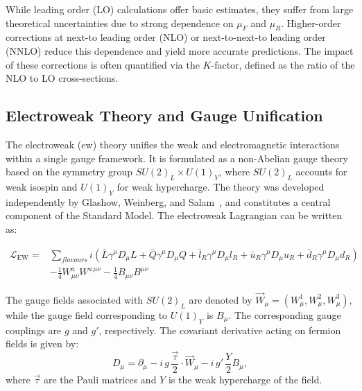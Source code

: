 While leading order (LO) calculations offer basic estimates, they suffer from large theoretical uncertainties due to strong dependence on $\mu_F$ and $\mu_R$. Higher-order corrections at next-to leading order (NLO) or next-to-next-to leading order (NNLO) reduce this dependence and yield more accurate predictions. The impact of these corrections is often quantified via the $K$-factor, defined as the ratio of the NLO to LO cross-sections.

\subsection{Electroweak Theory and Gauge Unification}
\label{subsec:ew_theory}

The electroweak (\acrshort{ew}) theory unifies the weak and electromagnetic interactions within a single gauge framework. It is formulated as a non-Abelian gauge theory based on the symmetry group $SU(2)_L \times U(1)_Y$, where $SU(2)_L$ accounts for weak isospin and $U(1)_Y$ for weak hypercharge. The theory was developed independently by Glashow, Weinberg, and Salam~\cite{Glashow,Weinberg,Salam}, and constitutes a central component of the Standard Model. The electroweak Lagrangian can be written as:

\begin{equation}
\begin{split}
\mathcal{L}_{\text{EW}} = 
&\sum_{flavours} i(\bar{L}\gamma^\mu D_\mu L +\bar{Q}\gamma^\mu D_\mu Q + \bar{l}_{R}\gamma^\mu D_\mu l_{R} + \bar{u}_{R}\gamma^\mu D_\mu u_{R} + \bar{d}_{R}\gamma^\mu D_\mu d_{R}) \\
&- \frac{1}{4} W_{\mu\nu}^a W^{a\,\mu\nu} - \frac{1}{4} B_{\mu\nu} B^{\mu\nu}
\end{split}
\label{eq:ew_lagrangian}
\end{equation}

The gauge fields associated with $SU(2)_L$ are denoted by $\vec{W}_\mu = (W_\mu^1, W_\mu^2, W_\mu^3)$, while the gauge field corresponding to $U(1)_Y$ is $B_\mu$. The corresponding gauge couplings are $g$ and $g'$, respectively. The covariant derivative acting on fermion fields is given by:
\begin{equation}
D_\mu = \partial_\mu - i \, g \, \frac{\vec{\tau}}{2} \cdot \vec{W}_\mu - i \, g' \, \frac{Y}{2} B_\mu,
\end{equation}
where $\vec{\tau}$ are the Pauli matrices and $Y$ is the weak hypercharge of the field.


